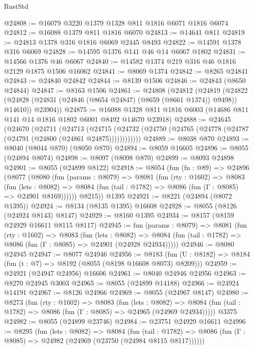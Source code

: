 \begin{lexlean}{RustStd}
\begin{coremodule}
@24808 := @16079 @3220 @1379 @1328 @811 @1816 @6071 @1816 @6074
@24812 := @16088 @1379 @811 @1816 @6070
@24813 := @14641 @811
@24819 := @24813 @1378 @316 @1816 @6069 @2445 @8493
@24822 := @14591 @1378 @316 @6069
@24828 := @14595 @1376 @141 @46 @14 @6067 @1802
@24831 := @14566 @1376 @46 @6067
@24840 := @14582 @1374 @219 @316 @46 @1816 @2129 @1875 @1506 @16062
@24841 := @8069 @1374
@24842 := @8265 @24841
@24843 := @24840 @24842
@24844 := @8139 @1506
@24846 := @24843 (@8650 @24844)
@24847 := @8163 @1506
@24861 := @24808
    (@24812
      (@24819
        (@24822 (@24828 (@24831 (@24846 (@8654 @24847) (@8659 (@8661 @1374)) @9498)) @14610))
        @23904))
@24875 := @16088 @1328 @811 @1816 @6003 (@14686 @811 @141 @14 @1816 @1802 @6001 @8492 @14670 @23918)
@24888 := @24645
    (@24670
      (@24711
        (@24713
          (@24715 (@24732 (@24750 (@24765 (@24778 (@24787 (@24791 (@24800 (@24861 @24875))))))))))))
@24889 := @8038 @870
@24893 := @8040 (@8044 @870) (@8050 @870)
@24894 := @8059 @16605
@24896 := @8055 (@24894 @8074)
@24898 := @8097 (@8098 @870)
@24899 := @8093 @24898
@24901 := @8055 (@24899 @8122)
@24918 := @8054
    (fun (fn : @89) =>
    @24896
      (@8077
        (@8080
          (fun (params : @8079) =>
          @8081
            (fun (rty : @1602) =>
            @8083
              (fun (lets : @8082) =>
              @8084 (fun (tail : @1782) => @8086 (fun (Γ : @8085) => @24901 @8169))))))
        @8215))
    @1395
@24921 := @8221 (@24894 (@8072 @1395))
@24924 := @8134 (@8135 @1395) @16608
@24928 := @8055 (@8126 (@24924 @8143) @8147)
@24929 := @8160 @1395
@24934 := @8157 (@8159 @24929 @16611 @8115 @8117)
@24945 := fun (params : @8079) =>
  @8081
    (fun (rty : @1602) =>
    @8083
      (fun (lets : @8082) =>
      @8084 (fun (tail : @1782) => @8086 (fun (Γ : @8085) => @24901 (@24928 @24934)))))
@24946 := @8080 @24945
@24947 := @8077 @24946
@24956 := @8183
    (fun (U : @8182) => @8184 (fun (t : @7) => @8192 (@8055 (@8198 @16608 @8073) @8209)))
@24959 := @24921 (@24947 @24956) @16606
@24961 := @8040 @24946 @24956
@24963 := @8270 @24945 @3003
@24965 := @8055 (@24899 @14188)
@24966 := @24924 @14191
@24967 := @8126 @24966
@24969 := @8055 (@24967 @8147)
@24980 := @8273
    (fun (rty : @1602) =>
    @8083
      (fun (lets : @8082) =>
      @8084 (fun (tail : @1782) => @8086 (fun (Γ : @8085) => @24965 (@24969 @24934)))))
    @3375
@24982 := @8055 (@24899 @23746)
@24984 := @23751 @24929 @16611
@24996 := @8295
    (fun (lets : @8082) =>
    @8084
      (fun (tail : @1782) =>
      @8086 (fun (Γ : @8085) => @24982 (@24969 (@23750 (@24984 @8115 @8117))))))

\end{coremodule}
\end{lexlean}
